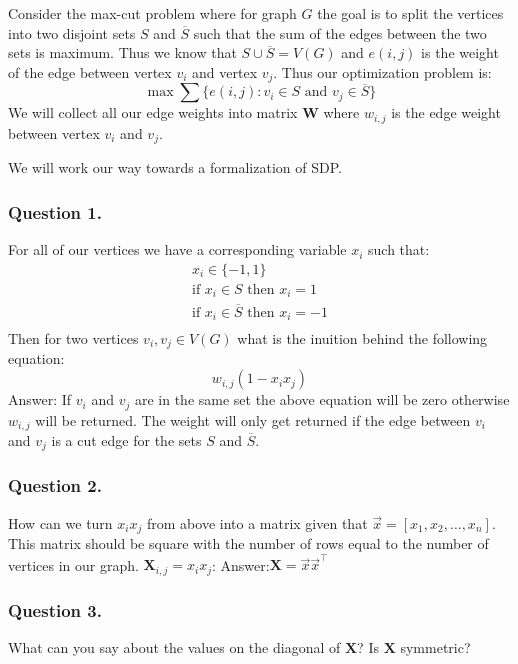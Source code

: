 \documentclass{article}
\begin{document}
Consider the max-cut problem where for graph \( G \) the goal is to split the vertices into two disjoint sets \( S \) and \( \overline{S} \) such that the sum of the edges between the two sets is maximum.
Thus we know that \( S \cup \overline{S} = V(G) \) and \( e(i, j) \) is the weight of the edge between vertex \( v_i \) and vertex \( v_j \).
Thus our optimization problem is:
\[
  \max \sum \{ e(i, j): v_i \in S \text{ and } v_j \in \overline{S} \}
\]
We will collect all our edge weights into matrix \( \mathbf{W} \) where \( w_{i, j} \) is the edge weight between vertex \( v_i \) and \( v_j \).

We will work our way towards a formalization of SDP.
\subsubsection{Question 1.}
For all of our vertices we have a corresponding variable \( x_i \) such that:
\begin{gather*}
x_i \in \{ -1, 1 \} \\
\text{if } x_i \in S \text{ then } x_i = 1 \\
\text{if } x_i \in \overline{S} \text{ then } x_i = -1 \\
\end{gather*}
Then for two vertices \( v_i, v_j \in V(G) \) what is the inuition behind the following equation:
\[
w_{i, j}(1 - x_i x_j)
\]
Answer: If \( v_i \) and \( v_j \) are in the same set the above equation will be zero otherwise \( w_{i, j} \) will be returned. The weight will only get returned if the edge between \( v_i \) and \( v_j \) is a cut edge for the sets \( S \) and \( \overline{S} \).

\subsubsection{Question 2.}
How can we turn \( x_i x_j \) from above into a matrix given that \( \vec{x} = [x_1, x_2, \ldots, x_n] \). This matrix should be square with the number of rows equal to the number of vertices in our graph. \( \mathbf{X}_{i, j} = x_i x_j \):
Answer:\( \mathbf{X} = \vec{x} \vec{x}^\top \)

\subsubsection{Question 3.}
What can you say about the values on the diagonal of \( \mathbf{X} \)? Is \( \mathbf{X} \) symmetric?
\end{document}
